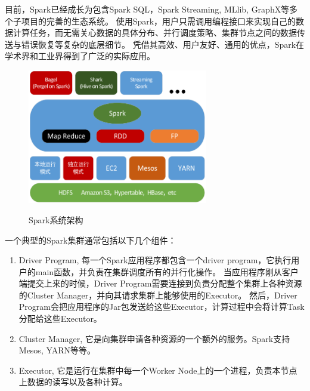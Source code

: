 \documentclass[master]{njuthesis}
\begin{document}
目前，Spark已经成长为包含Spark SQL，Spark Streaming, MLlib, GraphX等多个子项目的完善的生态系统。
使用Spark，用户只需调用编程接口来实现自己的数据计算任务，而无需关心数据的具体分布、并行调度策略、集群节点之间的数据传送与错误恢复等复杂的底层细节。
凭借其高效、用户友好、通用的优点，Spark在学术界和工业界得到了广泛的实际应用。
\begin{figure}[h]
  \centering
  \includegraphics[width= 0.7\textwidth]{figure/spark_stack.png}\\
  \caption{Spark系统架构}
  \label{fig:spark_stack}
\end{figure}

一个典型的Spark集群通常包括以下几个组件：
\begin{enumerate}
 \item Driver Program, 每一个Spark应用程序都包含一个driver program，它执行用户的main函数，并负责在集群调度所有的并行化操作。
当应用程序刚从客户端提交上来的时候，Driver Program需要连接到负责分配整个集群上各种资源的Cluster Manager，并向其请求集群上能够使用的Executor。 
然后，Driver Program会把应用程序的Jar包发送给这些Executor，计算过程中会将计算Task分配给这些Executor。
\item Cluster Manager, 它是向集群申请各种资源的一个额外的服务。Spark支持Mesos, YARN等等。
\item Executor, 它是运行在集群中每一个Worker Node上的一个进程，负责本节点上数据的读写以及各种计算。

\end{enumerate}
\end{document}
